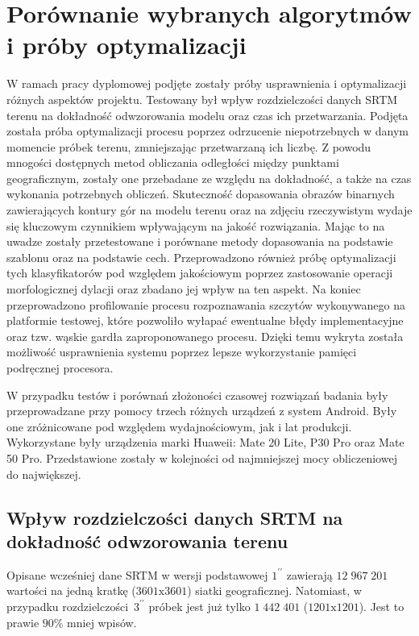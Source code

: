\newpage

\section{Porównanie wybranych algorytmów i próby optymalizacji} \label{sec:testing}

W ramach pracy dyplomowej podjęte zostały próby usprawnienia i optymalizacji różnych aspektów projektu. Testowany był wpływ rozdzielczości danych SRTM terenu na dokładność odwzorowania modelu oraz czas ich przetwarzania. Podjęta została próba optymalizacji procesu poprzez odrzucenie niepotrzebnych w danym momencie próbek terenu, zmniejszając przetwarzaną ich liczbę. Z powodu mnogości dostępnych metod obliczania odległości między punktami geograficznym, zostały one przebadane ze względu na dokładność, a także na czas wykonania potrzebnych obliczeń. Skuteczność dopasowania obrazów binarnych zawierających kontury gór na modelu terenu oraz na zdjęciu rzeczywistym wydaje się kluczowym czynnikiem wpływającym na jakość rozwiązania. Mając to na uwadze zostały przetestowane i porównane metody dopasowania na podstawie szablonu oraz na podstawie cech. Przeprowadzono również próbę optymalizacji tych klasyfikatorów pod względem jakościowym poprzez zastosowanie operacji morfologicznej dylacji oraz zbadano jej wpływ na ten aspekt. Na koniec przeprowadzono profilowanie procesu rozpoznawania szczytów wykonywanego na platformie testowej, które pozwoliło wyłapać ewentualne błędy implementacyjne oraz tzw. wąskie gardła zaproponowanego procesu. Dzięki temu wykryta została możliwość usprawnienia systemu poprzez lepsze wykorzystanie pamięci podręcznej procesora. 

W przypadku testów i porównań złożoności czasowej rozwiązań badania były przeprowadzane przy pomocy trzech różnych urządzeń z system Android. Były one zróżnicowane pod względem wydajnościowym, jak i lat produkcji. Wykorzystane były urządzenia marki Huaweii: Mate 20 Lite, P30 Pro oraz Mate 50 Pro. Przedstawione zostały w kolejności od najmniejszej mocy obliczeniowej do największej. 


\subsection{Wpływ rozdzielczości danych SRTM na dokładność odwzorowania terenu} \label{sec:rozdzielczosc_srtm}

Opisane wcześniej dane SRTM w wersji podstawowej $1^{\prime\prime}$ zawierają $12 \; 967 \; 201$ wartości na jedną kratkę ($3601 \textrm{x} 3601$) siatki geograficznej. Natomiast, w przypadku rozdzielczości~$3^{\prime\prime}$ próbek jest już tylko $1 \; 442 \; 401$ ($1201 \textrm{x} 1201$). Jest to prawie $90\%$ mniej wpisów.

